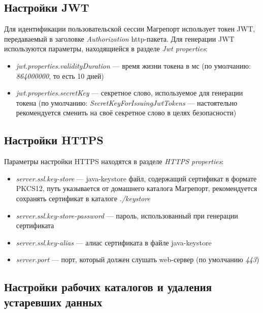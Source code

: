 \documentclass[../user-manual.tex]{subfiles}
\begin{document}
	\subsection{Настройки JWT}
	
	Для идентификации пользовательской сессии Магрепорт использует токен JWT, передаваемый в заголовке \textit{Authorization} http-пакета. Для генерации JWT используются параметры, находящиейся в разделе \textit{Jwt properties}:
	
	\begin{itemize}
		\item \textit{jwt.properties.validityDuration} --- время жизни токена в мс (по умолчанию: \textit{864000000}, то есть 10 дней)
		
		\item \textit{jwt.properties.secretKey} --- секретное слово, используемое для генерации токена (по умолчанию: \textit{SecretKeyForIssuingJwtTokens} --- настоятельно рекомендуется сменить на своё секретное слово в целях безопасности)
	\end{itemize}
	
	\subsection{Настройки HTTPS}\label{subsection:https-settings}
	
	Параметры настройки HTTPS находятся в разделе \textit{HTTPS properties}:
	
	\begin{itemize}
		\item \textit{server.ssl.key-store} --- java-keystore файл, содержащий сертификат в формате PKCS12, путь указывается от домашнего каталога Магрепорт, рекомендуется сохранять сертификат в каталоге \textit{./keystore}
		
		\item \textit{server.ssl.key-store-password} --- пароль, использованный при генерации сертификата
		
		\item \textit{server.ssl.key-alias} --- алиас сертификата в файле java-keystore
		
		\item \textit{server.port} --- порт, который должен слушать web-сервер (по умолчанию \textit{443})
	\end{itemize}
	
	\subsection{Настройки рабочих каталогов и удаления устаревших данных} \label{subsection:folders-settings}
	
\end{document}
